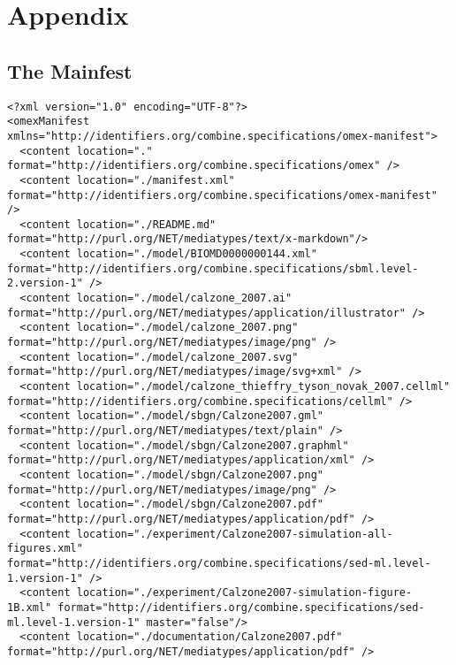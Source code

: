 \section{Appendix}
\label{sec:appendix}

\subsection{The Mainfest}
\label{sec:manifest}
\begin{mdframed}[style=mddefault,frametitle={The \texttt{manifest.xml} of the final COMBINE archive}]
\begin{verbatim}
<?xml version="1.0" encoding="UTF-8"?>
<omexManifest xmlns="http://identifiers.org/combine.specifications/omex-manifest">
  <content location="." format="http://identifiers.org/combine.specifications/omex" />
  <content location="./manifest.xml" format="http://identifiers.org/combine.specifications/omex-manifest" />
  <content location="./README.md" format="http://purl.org/NET/mediatypes/text/x-markdown"/>
  <content location="./model/BIOMD0000000144.xml" format="http://identifiers.org/combine.specifications/sbml.level-2.version-1" />
  <content location="./model/calzone_2007.ai" format="http://purl.org/NET/mediatypes/application/illustrator" />
  <content location="./model/calzone_2007.png" format="http://purl.org/NET/mediatypes/image/png" />
  <content location="./model/calzone_2007.svg" format="http://purl.org/NET/mediatypes/image/svg+xml" />
  <content location="./model/calzone_thieffry_tyson_novak_2007.cellml" format="http://identifiers.org/combine.specifications/cellml" />
  <content location="./model/sbgn/Calzone2007.gml" format="http://purl.org/NET/mediatypes/text/plain" />
  <content location="./model/sbgn/Calzone2007.graphml" format="http://purl.org/NET/mediatypes/application/xml" />
  <content location="./model/sbgn/Calzone2007.png" format="http://purl.org/NET/mediatypes/image/png" />
  <content location="./model/sbgn/Calzone2007.pdf" format="http://purl.org/NET/mediatypes/application/pdf" />
  <content location="./experiment/Calzone2007-simulation-all-figures.xml" format="http://identifiers.org/combine.specifications/sed-ml.level-1.version-1" />
  <content location="./experiment/Calzone2007-simulation-figure-1B.xml" format="http://identifiers.org/combine.specifications/sed-ml.level-1.version-1" master="false"/>
  <content location="./documentation/Calzone2007.pdf" format="http://purl.org/NET/mediatypes/application/pdf" />

\end{verbatim}
\end{mdframed}
